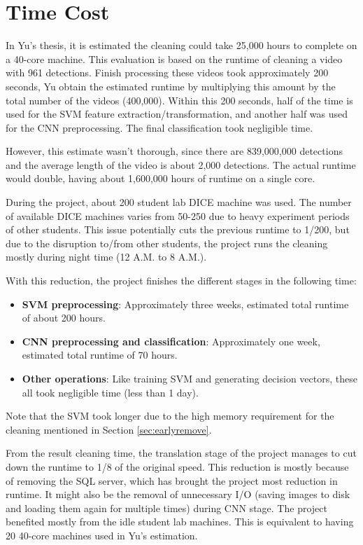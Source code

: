 \documentclass[bsc,logo,twoside,fullspacing,parskip]{infthesis}
\begin{document}
\section{Time Cost} 

In Yu's thesis\cite{Yu}, it is estimated the cleaning could take 25,000 hours to complete on a 40-core machine.
This evaluation is based on the runtime of cleaning a video with 961 detections.
Finish processing these videos took approximately 200 seconds, Yu obtain the estimated runtime by multiplying this amount by the total number of the videos (400,000).
Within this 200 seconds, half of the time is used for the SVM feature extraction/transformation, and another half was used for the CNN preprocessing. The final classification took negligible time.

However, this estimate wasn't thorough, since there are 839,000,000 detections and the average length of the video is about 2,000 detections.
The actual runtime would double, having about 1,600,000 hours of runtime on a single core. 

During the project, about 200 student lab DICE machine was used. 
The number of available DICE machines varies from 50-250 due to heavy experiment periods of other students.
This issue potentially cuts the previous runtime to 1/200, but due to the disruption to/from other students, the project runs the cleaning mostly during night time (12 A.M. to 8 A.M.).

With this reduction, the project finishes the different stages in the following time:
\begin{itemize}
\setlength{\parskip}{-1pt}
\item \textbf{SVM preprocessing}: Approximately three weeks, estimated total runtime of about 200 hours. 
\item \textbf{CNN preprocessing and classification}: Approximately one week, estimated total runtime of 70 hours. 
\item \textbf{Other operations}: Like training SVM and generating decision vectors, these all took negligible time (less than 1 day). 
\end{itemize}
Note that the SVM took longer due to the high memory requirement for the cleaning mentioned in Section \ref{sec:earlyremove}.

From the result cleaning time, the translation stage of the project manages to cut down the runtime to 1/8 of the original speed.
This reduction is mostly because of removing the SQL server, which has brought the project most reduction in runtime. 
It might also be the removal of unnecessary I/O (saving images to disk and loading them again for multiple times) during CNN stage. 
The project benefited mostly from the idle student lab machines. This is equivalent to having 20 40-core machines used in Yu's estimation.
\newpage
\end{document}
